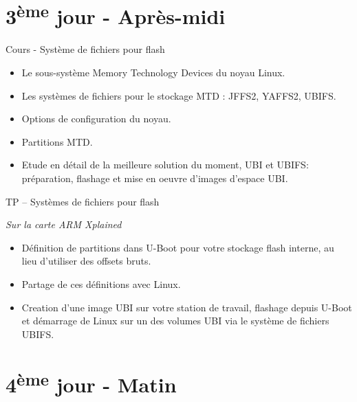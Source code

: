 \documentclass[a4paper,12pt,obeyspaces,spaces,hyphens]{article}
\begin{document}
\section{3\textsuperscript{ème} jour - Après-midi}

\feagendatwocolumn
{Cours - Système de fichiers pour flash}
{
  \begin{itemize}
  \item Le sous-système Memory Technology Devices du noyau Linux.
  \item Les systèmes de fichiers pour le stockage MTD : JFFS2, YAFFS2, UBIFS.
  \item Options de configuration du noyau.
  \item Partitions MTD.
  \item Etude en détail de la meilleure solution du moment, UBI et UBIFS:
	préparation, flashage et mise en oeuvre d'images d'espace UBI.

  \end{itemize}
}
{TP – Systèmes de fichiers pour flash}
{
  {\em Sur la carte ARM Xplained}
  \begin{itemize}
  \item Définition de partitions dans U-Boot pour
        votre stockage flash interne, au lieu d'utiliser
        des offsets bruts.
  \item Partage de ces définitions avec Linux.
  \item Creation d'une image UBI sur votre station de travail,
	flashage depuis U-Boot et démarrage de Linux sur un 
        des volumes UBI via le système de fichiers UBIFS.
  \end{itemize}
}

\section{4\textsuperscript{ème} jour - Matin}
\end{document}
